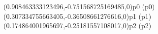 \psPoint(0.908463333123496,-0.751568725169485,0){p0}
\psdot(p0)
\psPoint(0.307334755663405,-0.36508661276616,0){p1}
\psdot(p1)
\psPoint(0.174864001965697,-0.25181557108017,0){p2}
\psdot(p2)
